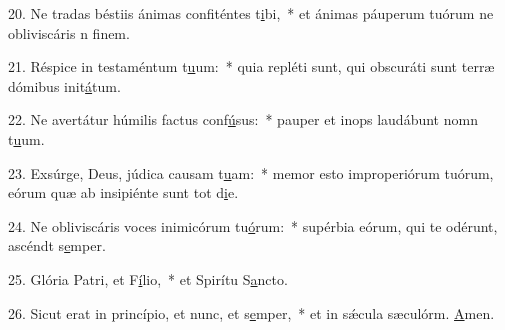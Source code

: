 20. Ne tradas béstiis ánimas confiténtes t\uline{i}bi,~* et ánimas páuperum tuórum ne obliviscáris n f\uline{i}nem.\par 
21. Réspice in testaméntum t\uline{u}um:~* quia repléti sunt, qui obscuráti sunt terræ dómibus init\uline{á}tum.\par 
22. Ne avertátur húmilis factus conf\uline{ú}sus:~* pauper et inops laudábunt nomn t\uline{u}um.\par 
23. Exsúrge, Deus, júdica causam t\uline{u}am:~* memor esto improperiórum tuórum, eórum quæ ab insipiénte sunt tot d\uline{i}e.\par 
24. Ne obliviscáris voces inimicórum tu\uline{ó}rum:~* supérbia eórum, qui te odérunt, ascéndt s\uline{e}mper.\par 
25. Glória Patri, et F\uline{í}lio,~* et Spirítu S\uline{a}ncto.\par 
26. Sicut erat in princípio, et nunc, et s\uline{e}mper,~* et in sǽcula sæculórm. \uline{A}men.\par 
